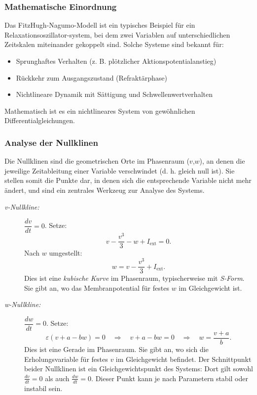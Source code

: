 \subsubsection{Mathematische Einordnung}
Das FitzHugh-Nagumo-Modell ist ein typisches Beispiel für ein Relaxationsoszillator-system, bei dem zwei Variablen auf unterschiedlichen Zeitskalen miteinander gekoppelt sind. Solche Systeme sind bekannt für:
%
\begin{itemize}
	\item Sprunghaftes Verhalten (z. B. plötzlicher Aktionspotentialanstieg)
	\item Rückkehr zum Ausgangszustand (Refraktärphase)
	\item Nichtlineare Dynamik mit Sättigung und Schwellenwertverhalten
\end{itemize}
Mathematisch ist es ein nichtlineares System von gewöhnlichen Differentialgleichungen.
\subsubsection{Analyse der Nullklinen}
Die Nullklinen sind die geometrischen Orte im Phasenraum ($v$,$w$),
an denen die jeweilige Zeitableitung einer Variable verschwindet
(d. h. gleich null ist).
Sie stellen somit die Punkte dar, in denen sich die entsprechende
Variable nicht mehr ändert, und sind ein zentrales Werkzeug zur
Analyse des Systems.
%

\begin{description}
\item[\emph{v-Nullkline:}] $\dfrac{dv}{dt} = 0$.
Setze:
\[
v - \frac{v^3}{3} - w + I_{\text{ext}} = 0.
\]
Nach $w$ umgestellt:
\[
w = v - \frac{v^3}{3} + I_{\text{ext}}.
\]
Dies ist eine \emph{kubische Kurve} im Phasenraum, typischerweise mit \emph{S-Form}.  
%
Sie gibt an, wo das Membranpotential für festes $w$ im Gleichgewicht ist.

\item[\emph{w-Nullkline:}] $\dfrac{dw}{dt} = 0$.
Setze:
\[
\varepsilon (v + a - b w) = 0
\quad\Rightarrow\quad
v + a - b w = 0
\quad\Rightarrow\quad
w = \frac{v + a}{b}.
\]
Dies ist eine Gerade im Phasenraum.  
%
Sie gibt an, wo sich die Erholungsvariable für festes $v$ im
Gleichgewicht befindet.
Der Schnittpunkt beider Nullklinen ist ein Gleichgewichtspunkt des
%
Systems: Dort gilt sowohl $\frac{dv}{dt} = 0$ als
auch $\frac{dw}{dt} = 0$.
Dieser Punkt kann je nach Parametern stabil oder instabil sein.
\end{description}

